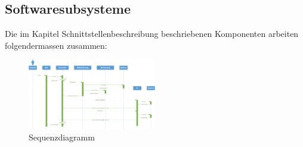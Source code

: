 \subsection{Softwaresubsysteme}
Die im Kapitel Schnittstellenbeschreibung beschriebenen Komponenten arbeiten folgendermassen zusammen:
\begin{figure}[h!]          
	\centering             
	\includegraphics[width=0.5\textwidth]{../fig/Sequenzdiagramm Info.png}
	\caption{Sequenzdiagramm}
	\label{fig:Sequenzdiagramm}        
\end{figure}